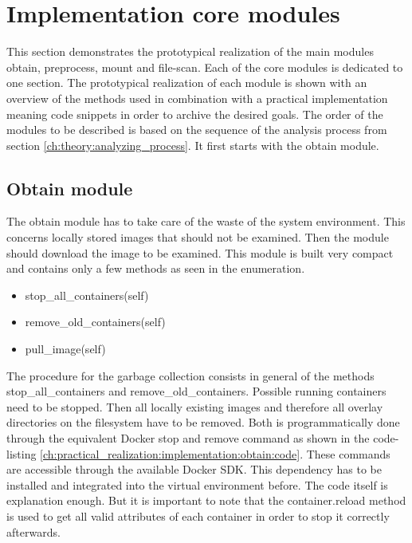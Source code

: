 \section{Implementation core modules}
\label{ch:practical_realization:implementation}
This section demonstrates the prototypical realization of the main modules obtain, preprocess, mount and file-scan.
Each of the core modules is dedicated to one section.
The prototypical realization of each module is shown with an overview of the methods used in combination with a practical implementation meaning code snippets in order to archive the desired goals. 
The order of the modules to be described is based on the sequence of the analysis process from section \ref{ch:theory:analyzing_process}.
It first starts with the obtain module.

\subsection{Obtain module}
\label{ch:practical_realization:implementation:obtain}
The obtain module has to take care of the waste of the system environment. 
This concerns locally stored images that should not be examined. 
Then the module should download the image to be examined.
This module is built very compact and contains only a few methods as seen in the enumeration.
\begin{itemize}
\item stop\_all\_containers(self)
\item remove\_old\_containers(self)
\item pull\_image(self)
\end{itemize}
The procedure for the garbage collection consists in general of the methods stop\_all\_containers and remove\_old\_containers.
Possible running containers need to be stopped.
Then all locally existing images and therefore all overlay directories on the filesystem have to be removed. 
Both is programmatically done through the equivalent Docker stop and remove command as shown in the code-listing \ref{ch:practical_realization:implementation:obtain:code}. 
These commands are accessible through the available Docker SDK. 
This dependency has to be installed and integrated into the virtual environment before. 
The code itself is explanation enough. 
But it is important to note that the container.reload method is used to get all valid attributes of each container in order to stop it correctly afterwards.

